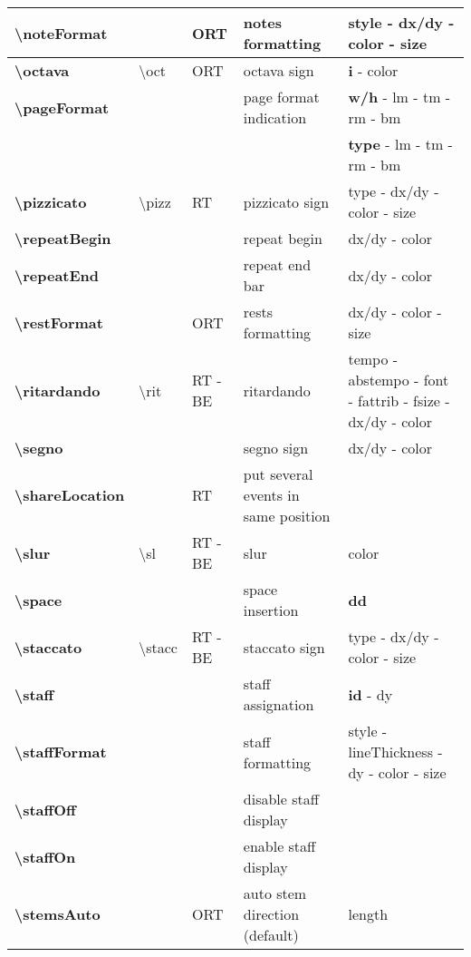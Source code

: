 \documentclass[a4paper, landscape, 10pt]{article}
\begin{document}
\begin{tabularx}{\linewidth}{p{3cm}p{4.5cm}p{3cm}p{5.5cm}l}
    \hline
    \textbf{\textbackslash{}noteFormat}&&ORT&notes formatting&style - dx/dy - color - size\\
    \hline
    \textbf{\textbackslash{}octava}&\textbackslash{}oct&ORT&octava sign&\textbf{i} - color\\
    \hline
    \textbf{\textbackslash{}pageFormat}&&&page format indication&\textbf{w/h} - lm - tm - rm - bm\\
    &&&&\textbf{type} - lm - tm - rm - bm\\
    \hline
    \textbf{\textbackslash{}pizzicato}&\textbackslash{}pizz&RT&pizzicato sign&type - dx/dy - color - size\\
    \hline
    \textbf{\textbackslash{}repeatBegin}&&&repeat begin &dx/dy - color\\
    \hline
    \textbf{\textbackslash{}repeatEnd}&&&repeat end bar&dx/dy - color\\
    \hline
    \textbf{\textbackslash{}restFormat}&&ORT&rests formatting&dx/dy - color - size\\
    \hline
    \textbf{\textbackslash{}ritardando}&\textbackslash{}rit&RT - BE&ritardando&tempo - abstempo - font - fattrib - fsize - dx/dy - color\\
    \hline
    \textbf{\textbackslash{}segno}&&&segno sign&dx/dy - color\\
    \hline
    \textbf{\textbackslash{}shareLocation}&&RT&put several events in same position&\\
    \hline
    \textbf{\textbackslash{}slur}&\textbackslash{}sl&RT - BE&slur&color\\
    \hline
    \textbf{\textbackslash{}space}&&&space insertion&\textbf{dd}\\
    \hline
    \textbf{\textbackslash{}staccato}&\textbackslash{}stacc&RT - BE&staccato sign&type - dx/dy - color - size\\
    \hline
    \textbf{\textbackslash{}staff}&&&staff assignation&\textbf{id} - dy\\
    \hline
    \textbf{\textbackslash{}staffFormat}&&&staff formatting&style - lineThickness - dy - color - size\\
    \hline
    \textbf{\textbackslash{}staffOff}&&&disable staff display&\\
    \hline
    \textbf{\textbackslash{}staffOn}&&&enable staff display&\\
    \hline
    \textbf{\textbackslash{}stemsAuto}&&ORT&auto stem direction (default)&length\\

\end{tabularx}
\end{document}
